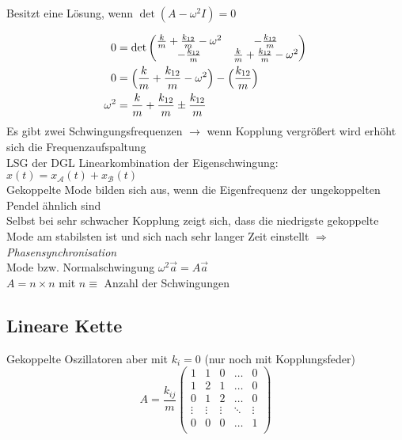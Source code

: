 \documentclass[a4paper,12pt]{report}
\begin{document}
Besitzt eine Lösung, wenn $ \det(A - \omega^2 I) = 0 $

\begin{align*}
0 &= \det
\begin{pmatrix}
 \frac{k}{m} +\frac{k_{12}}{m}- \omega^2 & -\frac{k_{12}}{m} \\
-\frac{k_{12}}{m} & \frac{k}{m} +\frac{k_{12}}{m} - \omega^2\\
\end{pmatrix}
\\
0 &= \Bigl( \frac{k}{m}+ \frac{k_{12}}{m} - \omega^2 \Bigr) - \Bigl( \frac{k_{12}}{m} \Bigr) \\
\omega^2  &= \frac{k}{m}+ \frac{k_{12}}{m} \pm \frac{k_{12}}{m} \\
\end{align*}
Es gibt zwei Schwingungsfrequenzen $ \rightarrow $ wenn Kopplung vergrößert wird erhöht sich die Frequenzaufspaltung \\

LSG der DGL Linearkombination der Eigenschwingung: $ x(t) = x_\mathcal{A}(t) + x_\mathcal{B}(t) $ \\

Gekoppelte Mode bilden sich aus, wenn die Eigenfrequenz der ungekoppelten Pendel ähnlich sind \\

Selbst bei sehr schwacher Kopplung zeigt sich, dass die niedrigste gekoppelte Mode am stabilsten ist und sich nach sehr langer Zeit einstellt
$ \Rightarrow $  \emph{Phasensynchronisation}\\

Mode bzw. Normalschwingung $\omega^2 \vec{a} = A \vec{a} $ \\

$ A = n \times n$ mit $ n \equiv $ Anzahl der Schwingungen \\ 

\subsection{Lineare Kette}

Gekoppelte Oszillatoren aber mit $ k_i = 0$ (nur noch mit Kopplungsfeder)
\begin{equation}
A = \frac{k_{ij}}{m} 
\begin{pmatrix}
1 & 1 & 0 & \dots & 0 \\
1 & 2 & 1 & \dots & 0 \\
0 & 1 & 2 & \dots & 0 \\
\vdots & \vdots & \vdots & \ddots & \vdots \\
0 & 0 & 0 & \dots & 1 \\
\end{pmatrix}
\end{equation}
\end{document}
